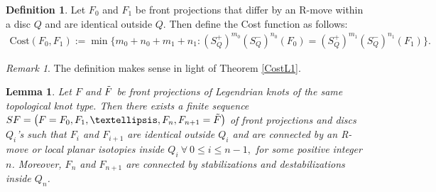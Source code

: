 \documentclass[11pt]{amsart}
\numberwithin{equation}{section}
\theoremstyle{plain}
\newtheorem{Lemma}[equation]{Lemma}
\theoremstyle{definition}
\newtheorem{definition}[equation]{Definition}
\theoremstyle{remark} \newtheorem{remark}[equation]{Remark}
\theoremstyle{remark} \newtheorem{observation}[equation]{Observation}
\newcommand{\Cost}{\text{Cost}}
\begin{document}
\begin{definition}
    Let $F_0$ and $F_1$ be front projections that differ by an R-move within a disc $Q$ and are identical outside $Q$. Then define the Cost function as follows:
    \begin{align*}
        \Cost(F_0,F_1) := \min  \{m_0+n_0+m_1+n_1:  (S^+_{Q})^{m_0}(S^-_{Q})^{n_0}(F_0)
       =(S^+_{Q})^{m_1}(S^-_{Q})^{n_1}(F_1)\}.
    \end{align*}
        
\end{definition}
\begin{remark}
    The definition makes sense in light of Theorem \ref{CostL1}.
\end{remark}
\begin{Lemma}\label{CostL2}
    Let $F$ and $\Tilde{F}$ be front projections of Legendrian knots of the same topological knot type. Then there exists a finite sequence $SF=\left(F=F_0,F_1,\ldots,F_n,F_{n+1}=\Tilde{F}\right)$ of front projections and discs $Q_i$'s such that $F_i$ and $F_{i+1}$ are identical outside $Q_i$ and are connected by an R-move or local planar isotopies inside $Q_i\: \forall \ 0\leq i \leq n-1,$ for some positive integer $n$. Moreover, $F_n $ and $F_{n+1} $ are connected by stabilizations and destabilizations inside $Q_n$.
\end{Lemma}
\end{document}
